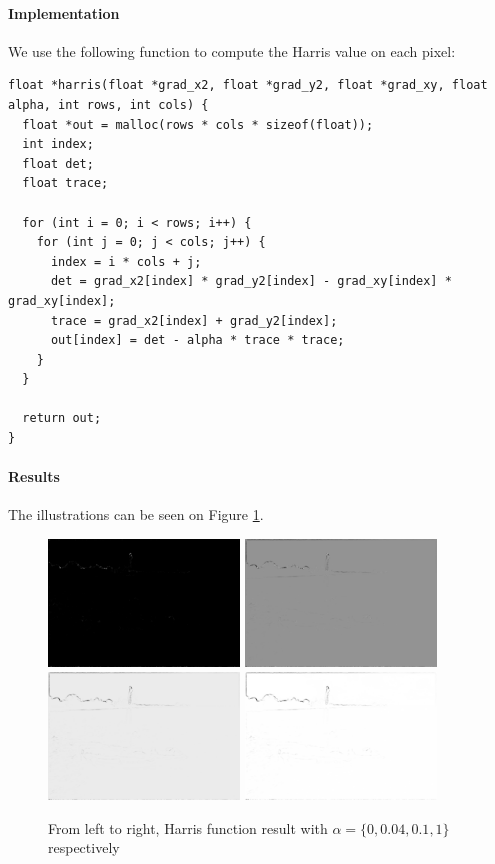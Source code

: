 \documentclass[a4paper, 10pt]{article}
\begin{document}
\paragraph{Implementation} We use the following function to compute the Harris value on each pixel:
\begin{lstlisting}[frame=single]
float *harris(float *grad_x2, float *grad_y2, float *grad_xy, float alpha, int rows, int cols) {
  float *out = malloc(rows * cols * sizeof(float));
  int index;
  float det;
  float trace;

  for (int i = 0; i < rows; i++) {
    for (int j = 0; j < cols; j++) {
      index = i * cols + j;
      det = grad_x2[index] * grad_y2[index] - grad_xy[index] * grad_xy[index];
      trace = grad_x2[index] + grad_y2[index];
      out[index] = det - alpha * trace * trace;
    }
  }

  return out;
}
\end{lstlisting}

\paragraph{Results} The illustrations can be seen on Figure \ref{fig-harris}.

\begin{figure}[!htb]
\centering
\includegraphics[width=192px]{boat3x3_5_harris_000.png}
\includegraphics[width=192px]{boat3x3_5_harris_004.png}
\includegraphics[width=192px]{boat3x3_5_harris_010.png}
\includegraphics[width=192px]{boat3x3_5_harris_100.png}
\caption{From left to right, Harris function result with $\alpha=\{0, 0.04, 0.1, 1\}$ respectively}
\label{fig-harris}
\end{figure}
\end{document}
